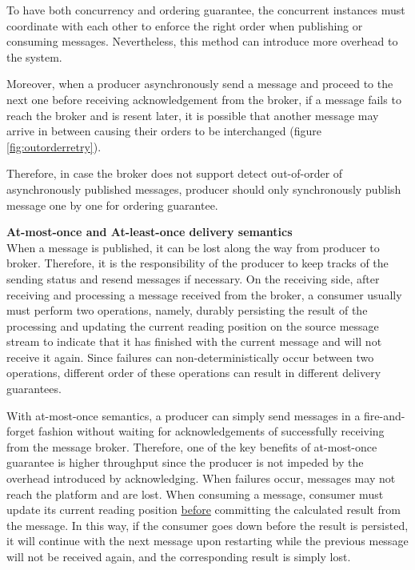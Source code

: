 To have both concurrency and ordering guarantee, the concurrent instances must coordinate with each other to enforce the right order when publishing or consuming messages. Nevertheless, this method can introduce more overhead to the system.

Moreover, when a producer asynchronously send a message and proceed to the next one before receiving acknowledgement from the broker, if a message fails to reach the broker and is resent later, it is possible that another message may arrive in between causing their orders to be interchanged (figure \ref{fig:outorderretry}).


Therefore, in case the broker does not support detect out-of-order of asynchronously published messages, producer should only synchronously publish message one by one for ordering guarantee.


\textbf{At-most-once and At-least-once delivery semantics}\\
When a message is published, it can be lost along the way from producer to broker. Therefore, it is the responsibility of the producer to keep tracks of the sending status and resend messages if necessary. On the receiving side, after receiving and processing a message received from the broker, a consumer usually must perform two operations, namely, durably persisting the result of the processing and updating the current reading position on the source message stream to indicate that it has finished with the current message and will not receive it again. Since failures can non-deterministically occur between two operations, different order of these operations can result in different delivery guarantees. 

With at-most-once semantics, a producer can simply send messages in a fire-and-forget fashion without waiting for acknowledgements of successfully receiving from the message broker. Therefore, one of the key benefits of at-most-once guarantee is higher throughput since the producer is not impeded by the overhead introduced by acknowledging. When failures occur, messages may not reach the platform and are lost. When consuming a message, consumer must update its current reading position \underline{before} committing the calculated result from the message. In this way, if the consumer goes down before the result is persisted, it will continue with the next message upon restarting while the previous message will not be received again, and the corresponding result is simply lost.

